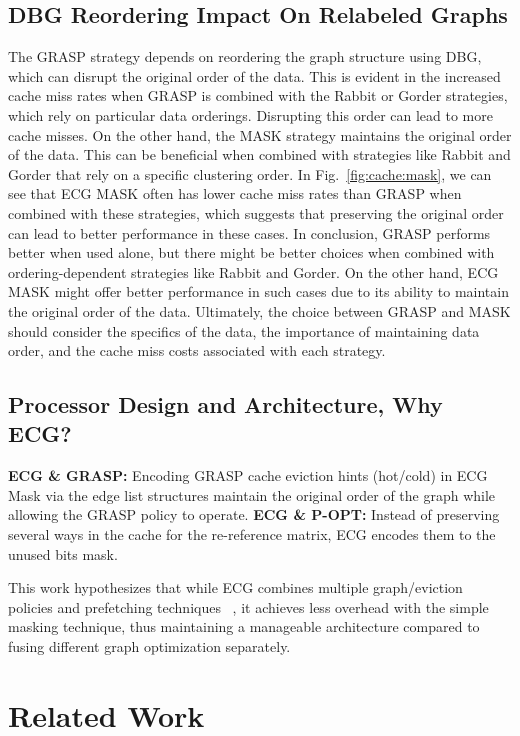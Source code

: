 \documentclass[conference]{IEEEtran}
\begin{document}
\subsection{DBG Reordering Impact On Relabeled Graphs}
The GRASP strategy depends on reordering the graph structure using DBG, which can disrupt the original order of the data. This is evident in the increased cache miss rates when GRASP is combined with the Rabbit or Gorder strategies, which rely on particular data orderings. Disrupting this order can lead to more cache misses.
On the other hand, the MASK strategy maintains the original order of the data. This can be beneficial when combined with strategies like Rabbit and Gorder that rely on a specific clustering order. In Fig.~\ref{fig:cache:mask}, we can see that ECG MASK often has lower cache miss rates than GRASP when combined with these strategies, which suggests that preserving the original order can lead to better performance in these cases.
In conclusion, GRASP performs better when used alone, but there might be better choices when combined with ordering-dependent strategies like Rabbit and Gorder. On the other hand, ECG MASK might offer better performance in such cases due to its ability to maintain the original order of the data. Ultimately, the choice between GRASP and MASK should consider the specifics of the data, the importance of maintaining data order, and the cache miss costs associated with each strategy.

\subsection{Processor Design and Architecture, Why ECG?}
\textbf{ECG \& GRASP:} Encoding GRASP cache eviction hints (hot/cold) in ECG Mask via the edge list structures maintain the original order of the graph while allowing the GRASP policy to operate.
\textbf{ECG \& P-OPT:} Instead of preserving several ways in the cache for the re-reference matrix, ECG encodes them to the unused bits mask. 

This work hypothesizes that while ECG combines multiple graph/eviction policies and prefetching techniques ~\cite{basak_analysis_2019,manocha_graphfire_2023}, it achieves less overhead with the simple masking technique, thus maintaining a manageable architecture compared to fusing different graph optimization separately.

\section{Related Work}
\label{ECG:RelatedWork}
\end{document}
